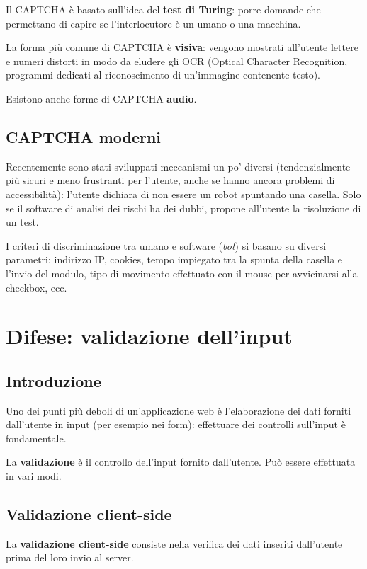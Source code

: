 Il CAPTCHA è basato sull'idea del \textbf{test di Turing}: porre domande che permettano di capire se l'interlocutore è un umano o una macchina.

La forma più comune di CAPTCHA è \textbf{visiva}: vengono mostrati all'utente lettere e numeri distorti in modo da eludere gli OCR (Optical Character Recognition, programmi dedicati al riconoscimento di un'immagine contenente testo).

Esistono anche forme di CAPTCHA \textbf{audio}.

\subsection{CAPTCHA moderni}

Recentemente sono stati sviluppati meccanismi un po' diversi (tendenzialmente più sicuri e meno frustranti per l'utente, anche se hanno ancora problemi di accessibilità): l'utente dichiara di non essere un robot spuntando una casella. Solo se il software di analisi dei rischi ha dei dubbi, propone all'utente la risoluzione di un test.

I criteri di discriminazione tra umano e software (\emph{bot}) si basano su diversi parametri: indirizzo IP, cookies, tempo impiegato tra la spunta della casella e l'invio del modulo, tipo di movimento effettuato con il mouse per avvicinarsi alla checkbox, ecc.

\section{Difese: validazione dell'input}

\subsection{Introduzione}

Uno dei punti più deboli di un'applicazione web è l'elaborazione dei dati forniti dall'utente in input (per esempio nei form): effettuare dei controlli sull'input è fondamentale.

La \textbf{validazione} è il controllo dell'input fornito dall'utente. Può essere effettuata in vari modi.

\subsection{Validazione client-side}

La \textbf{validazione client-side} consiste nella verifica dei dati inseriti dall'utente prima del loro invio al server.

